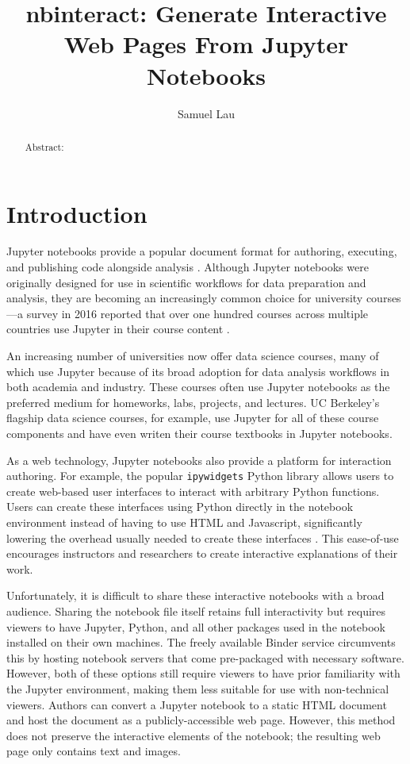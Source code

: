 \documentclass[nobib]{tufte-handout}
\title{nbinteract: Generate Interactive Web Pages From Jupyter Notebooks}
\author[Samuel Lau]{Samuel Lau}
\newcommand{\code}[1]{\texttt{#1}}
\begin{document}
\maketitle%

\begin{abstract}
\noindent
Abstract:
\end{abstract}

\section{Introduction} %
\label{sec:introduction}

Jupyter notebooks provide a popular document format for authoring, executing,
and publishing code alongside analysis \cite{thomas_jupyter_2016}. Although
Jupyter notebooks were originally designed for use in scientific workflows for
data preparation and analysis, they are becoming an increasingly common choice
for university courses---a survey in 2016 reported that over one hundred
courses across multiple countries use Jupyter in their course content
\cite{hamrick_2016_2016}.

An increasing number of universities now offer data science courses, many of
which use Jupyter because of its broad adoption for data analysis workflows in
both academia and industry. These courses often use Jupyter notebooks as the
preferred medium for homeworks, labs, projects, and lectures. UC Berkeley's
flagship data science courses, for example, use Jupyter for all of these course
components and have even writen their course textbooks in Jupyter notebooks.

As a web technology, Jupyter notebooks also provide a platform for interaction
authoring. For example, the popular \code{ipywidgets} Python library allows
users to create web-based user interfaces to interact with arbitrary Python
functions. Users can create these interfaces using Python directly in the
notebook environment instead of having to use HTML and Javascript,
significantly lowering the overhead usually needed to create these interfaces
\cite{_jupyter-widgets/ipywidgets_}. This ease-of-use encourages instructors
and researchers to create interactive explanations of their work.

Unfortunately, it is difficult to share these interactive notebooks with a
broad audience. Sharing the notebook file itself retains full interactivity but
requires viewers to have Jupyter, Python, and all other packages used in the
notebook installed on their own machines. The freely available Binder service
circumvents this by hosting notebook servers that come pre-packaged with
necessary software. However, both of these options still require viewers to
have prior familiarity with the Jupyter environment, making them less suitable
for use with non-technical viewers. Authors can convert a Jupyter notebook to a
static HTML document and host the document as a publicly-accessible web page.
However, this method does not preserve the interactive elements of the
notebook; the resulting web page only contains text and images.
\end{document}
